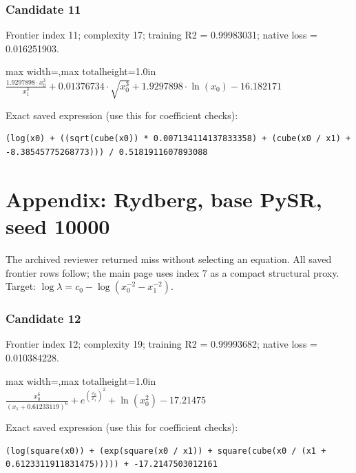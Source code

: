 \documentclass[10pt,letterpaper,landscape]{article}
\begin{document}
\subsubsection*{Candidate 11}
Frontier index 11; complexity 17; training R2 = 0.99983031; native loss = 0.016251903.
\begin{center}\begin{adjustbox}{max width=\linewidth,max totalheight=1.0in}$\displaystyle \frac{1.9297898 \cdot x_{0}^{3}}{x_{1}^{3}} + 0.01376734 \cdot \sqrt{x_{0}^{3}} + 1.9297898 \cdot \ln{\left(x_{0} \right)} - 16.182171$\end{adjustbox}\end{center}
{\scriptsize Exact saved expression (use this for coefficient checks):}
\begin{lstlisting}
(log(x0) + ((sqrt(cube(x0)) * 0.007134114137833358) + (cube(x0 / x1) + -8.38545775268773))) / 0.5181911607893088
\end{lstlisting}
\clearpage\section*{Appendix: Rydberg, base PySR, seed 10000}
The archived reviewer returned miss without selecting an equation. All saved frontier rows follow; the main page uses index 7 as a compact structural proxy. Target: $\log\lambda=c_0-\log(x_0^{-2}-x_1^{-2})$.
\subsubsection*{Candidate 12}
Frontier index 12; complexity 19; training R2 = 0.99993682; native loss = 0.010384228.
\begin{center}\begin{adjustbox}{max width=\linewidth,max totalheight=1.0in}$\displaystyle \frac{x_{0}^{6}}{\left(x_{1} + 0.61233119\right)^{6}} + e^{\left(\frac{x_{0}}{x_{1}}\right)^{2}} + \ln{\left(x_{0}^{2} \right)} - 17.21475$\end{adjustbox}\end{center}
{\scriptsize Exact saved expression (use this for coefficient checks):}
\begin{lstlisting}
(log(square(x0)) + (exp(square(x0 / x1)) + square(cube(x0 / (x1 + 0.6123311911831475))))) + -17.2147503012161
\end{lstlisting}
\end{document}
